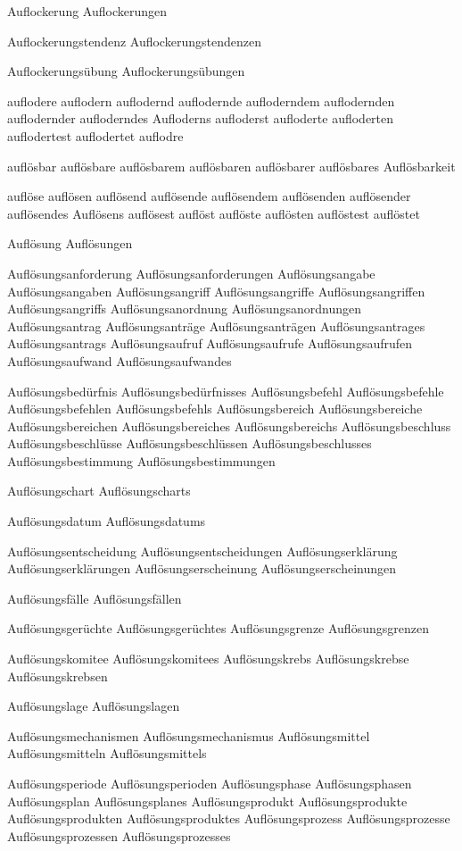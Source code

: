Auflockerung
Auflockerungen

Auflockerungstendenz
Auflockerungstendenzen

Auflockerungsübung
Auflockerungsübungen

auflodere
auflodern
auflodernd
auflodernde
aufloderndem
auflodernden
auflodernder
aufloderndes
Aufloderns
aufloderst
aufloderte
aufloderten
auflodertest
auflodertet
auflodre

auflösbar
auflösbare
auflösbarem
auflösbaren
auflösbarer
auflösbares
Auflösbarkeit

auflöse
auflösen
auflösend
auflösende
auflösendem
auflösenden
auflösender
auflösendes
Auflösens
auflösest
auflöst
auflöste
auflösten
auflöstest
auflöstet

Auflösung
Auflösungen

Auflösungsanforderung
Auflösungsanforderungen
Auflösungsangabe
Auflösungsangaben
Auflösungsangriff
Auflösungsangriffe
Auflösungsangriffen
Auflösungsangriffs
Auflösungsanordnung
Auflösungsanordnungen
Auflösungsantrag
Auflösungsanträge
Auflösungsanträgen
Auflösungsantrages
Auflösungsantrags
Auflösungsaufruf
Auflösungsaufrufe
Auflösungsaufrufen
Auflösungsaufwand
Auflösungsaufwandes

Auflösungsbedürfnis
Auflösungsbedürfnisses
Auflösungsbefehl
Auflösungsbefehle
Auflösungsbefehlen
Auflösungsbefehls
Auflösungsbereich
Auflösungsbereiche
Auflösungsbereichen
Auflösungsbereiches
Auflösungsbereichs
Auflösungsbeschluss
Auflösungsbeschlüsse
Auflösungsbeschlüssen
Auflösungsbeschlusses
Auflösungsbestimmung
Auflösungsbestimmungen

Auflösungschart
Auflösungscharts

Auflösungsdatum
Auflösungsdatums

Auflösungsentscheidung
Auflösungsentscheidungen
Auflösungserklärung
Auflösungserklärungen
Auflösungserscheinung
Auflösungserscheinungen

Auflösungsfälle
Auflösungsfällen

Auflösungsgerüchte
Auflösungsgerüchtes
Auflösungsgrenze
Auflösungsgrenzen

Auflösungskomitee
Auflösungskomitees
Auflösungskrebs
Auflösungskrebse
Auflösungskrebsen

Auflösungslage
Auflösungslagen

Auflösungsmechanismen
Auflösungsmechanismus
Auflösungsmittel
Auflösungsmitteln
Auflösungsmittels

Auflösungsperiode
Auflösungsperioden
Auflösungsphase
Auflösungsphasen
Auflösungsplan
Auflösungsplanes
Auflösungsprodukt
Auflösungsprodukte
Auflösungsprodukten
Auflösungsproduktes
Auflösungsprozess
Auflösungsprozesse
Auflösungsprozessen
Auflösungsprozesses

